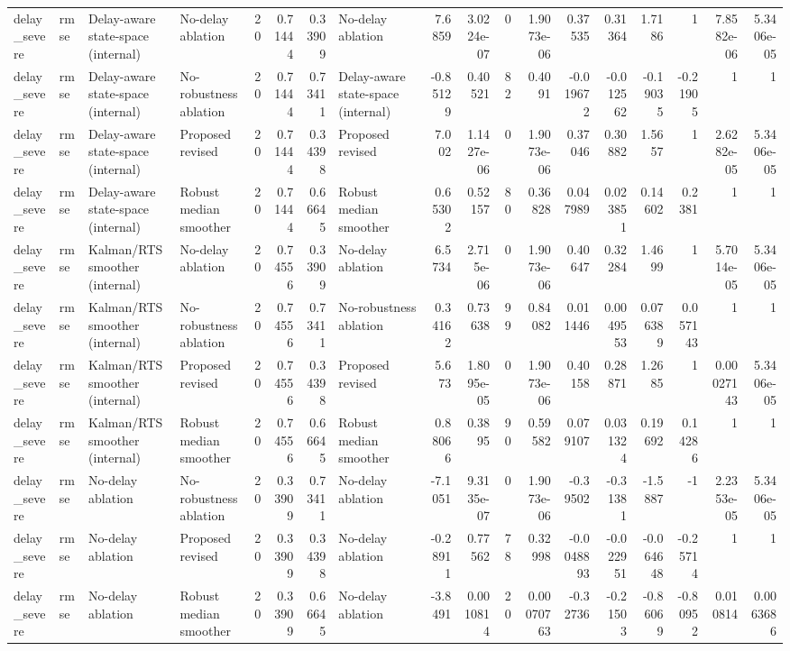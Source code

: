 \begin{table}[!htbp]
{\begin{tabular}{llllrrrlrrrrrrrrrr}
delay_severe & rmse & Delay-aware state-space (internal) & No-delay ablation & 20 & 0.71444 & 0.33909 & No-delay ablation & 7.6859 & 3.0224e-07 & 0 & 1.9073e-06 & 0.37535 & 0.31364 & 1.7186 & 1 & 7.8582e-06 & 5.3406e-05 \\
delay_severe & rmse & Delay-aware state-space (internal) & No-robustness ablation & 20 & 0.71444 & 0.73411 & Delay-aware state-space (internal) & -0.85129 & 0.40521 & 82 & 0.4091 & -0.019672 & -0.012562 & -0.19035 & -0.21905 & 1 & 1 \\
delay_severe & rmse & Delay-aware state-space (internal) & Proposed revised & 20 & 0.71444 & 0.34398 & Proposed revised & 7.002 & 1.1427e-06 & 0 & 1.9073e-06 & 0.37046 & 0.30882 & 1.5657 & 1 & 2.6282e-05 & 5.3406e-05 \\
delay_severe & rmse & Delay-aware state-space (internal) & Robust median smoother & 20 & 0.71444 & 0.66645 & Robust median smoother & 0.65302 & 0.52157 & 80 & 0.36828 & 0.047989 & 0.023851 & 0.14602 & 0.2381 & 1 & 1 \\
delay_severe & rmse & Kalman/RTS smoother (internal) & No-delay ablation & 20 & 0.74556 & 0.33909 & No-delay ablation & 6.5734 & 2.715e-06 & 0 & 1.9073e-06 & 0.40647 & 0.32284 & 1.4699 & 1 & 5.7014e-05 & 5.3406e-05 \\
delay_severe & rmse & Kalman/RTS smoother (internal) & No-robustness ablation & 20 & 0.74556 & 0.73411 & No-robustness ablation & 0.34162 & 0.73638 & 99 & 0.84082 & 0.011446 & 0.0049553 & 0.076389 & 0.057143 & 1 & 1 \\
delay_severe & rmse & Kalman/RTS smoother (internal) & Proposed revised & 20 & 0.74556 & 0.34398 & Proposed revised & 5.673 & 1.8095e-05 & 0 & 1.9073e-06 & 0.40158 & 0.28871 & 1.2685 & 1 & 0.00027143 & 5.3406e-05 \\
delay_severe & rmse & Kalman/RTS smoother (internal) & Robust median smoother & 20 & 0.74556 & 0.66645 & Robust median smoother & 0.88066 & 0.3895 & 90 & 0.59582 & 0.079107 & 0.031324 & 0.19692 & 0.14286 & 1 & 1 \\
delay_severe & rmse & No-delay ablation & No-robustness ablation & 20 & 0.33909 & 0.73411 & No-delay ablation & -7.1051 & 9.3135e-07 & 0 & 1.9073e-06 & -0.39502 & -0.31381 & -1.5887 & -1 & 2.2353e-05 & 5.3406e-05 \\
delay_severe & rmse & No-delay ablation & Proposed revised & 20 & 0.33909 & 0.34398 & No-delay ablation & -0.28911 & 0.77562 & 78 & 0.32998 & -0.0048893 & -0.022951 & -0.064648 & -0.25714 & 1 & 1 \\
delay_severe & rmse & No-delay ablation & Robust median smoother & 20 & 0.33909 & 0.66645 & No-delay ablation & -3.8491 & 0.0010814 & 20 & 0.00070763 & -0.32736 & -0.21503 & -0.86069 & -0.80952 & 0.010814 & 0.0063686 \\

\end{tabular}}
\end{table}
